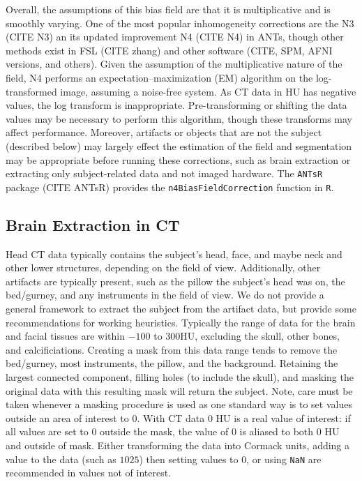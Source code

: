 \documentclass[]{elsarticle} %
\begin{document}
Overall, the assumptions of this bias field are that it is multiplicative and is smoothly varying. One of the most popular inhomogeneity corrections are the N3 (CITE N3) an its updated improvement N4 (CITE N4) in ANTs, though other methods exist in FSL (CITE zhang) and other software (CITE, SPM, AFNI versions, and others). Given the assumption of the multiplicative nature of the field, N4 performs an expectation--maximization (EM) algorithm on the log-transformed image, assuming a noise-free system. As CT data in HU has negative values, the log transform is inappropriate. Pre-transforming or shifting the data values may be necessary to perform this algorithm, though these transforms may affect performance. Moreover, artifacts or objects that are not the subject (described below) may largely effect the estimation of the field and segmentation may be appropriate before running these corrections, such as brain extraction or extracting only subject-related data and not imaged hardware. The \texttt{ANTsR} package (CITE ANTsR) provides the \texttt{n4BiasFieldCorrection} function in \texttt{R}.

\hypertarget{brain-extraction-in-ct}{%
\subsection{Brain Extraction in CT}\label{brain-extraction-in-ct}}

Head CT data typically contains the subject's head, face, and maybe neck and other lower structures, depending on the field of view. Additionally, other artifacts are typically present, such as the pillow the subject's head was on, the bed/gurney, and any instruments in the field of view. We do not provide a general framework to extract the subject from the artifact data, but provide some recommendations for working heuristics. Typically the range of data for the brain and facial tissues are within \(-100\) to \(300\)HU, excluding the skull, other bones, and calcificiations. Creating a mask from this data range tends to remove the bed/gurney, most instruments, the pillow, and the background. Retaining the largest connected component, filling holes (to include the skull), and masking the original data with this resulting mask will return the subject. Note, care must be taken whenever a masking procedure is used as one standard way is to set values outside an area of interest to \(0\). With CT data \(0\) HU is a real value of interest: if all values are set to \(0\) outside the mask, the value of \(0\) is aliased to both \(0\) HU and outside of mask. Either transforming the data into Cormack units, adding a value to the data (such as \(1025\)) then setting values to \(0\), or using \texttt{NaN} are recommended in values not of interest.
\end{document}
